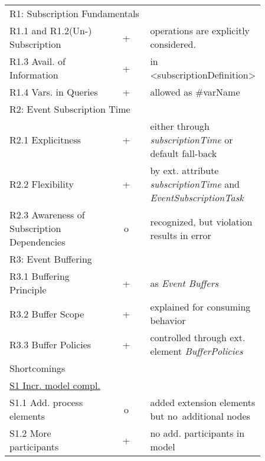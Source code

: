 \begin{table}%
	\myfloatalign
	\begin{tabularx}{\textwidth}{p{0.4\linewidth} | c | p{0.455\linewidth}}
		\toprule
		\tableheadline{Aspect} & \tableheadline{Ev.} & \tableheadline{Explanation} \\ 
		\midrule
		
		\multicolumn{3}{p{\linewidth}}{\rule{0pt}{4ex} R1: Subscription Fundamentals} \\
		\midrule
		
		R1.1 and R1.2\newline(Un-)\,Subscription & + & operations are explicitly considered. \\
		R1.3 Avail. of Information & + & in <subscriptionDefinition> \\
		R1.4 Vars. in Queries & + & allowed as \#{varName} \\
		
		\midrule
		\multicolumn{3}{p{\linewidth}}{\rule{0pt}{4ex} R2: Event Subscription Time} \\
		\midrule
		
		R2.1 Explicitness & + & either through \textit{subscriptionTime} or default fall-back \\
		R2.2 Flexibility & + & by ext. attribute \textit{subscriptionTime} and \textit{EventSubscriptionTask} \\
		R2.3 Awareness of Subscription Dependencies & o & recognized, but violation results in error \\
		
		\midrule
		\multicolumn{3}{p{\linewidth}}{\rule{0pt}{4ex} R3: Event Buffering} \\
		\midrule
		
		R3.1 Buffering Principle & + & as \textit{Event Buffers} \\
		R3.2 Buffer Scope & + & explained for consuming behavior \\
		R3.3 Buffer Policies & + & controlled through ext. element \textit{BufferPolicies} \\
		
		\midrule
		\multicolumn{3}{p{\linewidth}}{\rule{0pt}{4ex} Shortcomings} \\
		\midrule
		
		\rule{0pt}{4ex}\underline{S1 Incr. model compl.} & & \\
		S1.1 Add. process elements & o & added extension elements but no~additional nodes \\
		S1.2 More participants & + & no add. participants in model \\
		

\end{tabularx}
\end{table}
